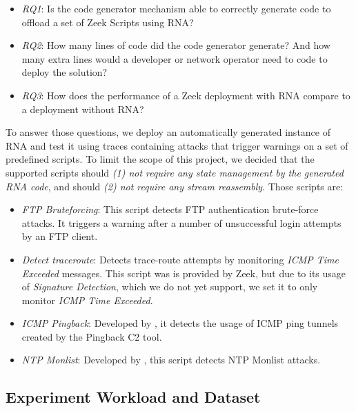 \begin{itemize}
    \item \textit{RQ1}: Is the code generator mechanism able to correctly generate code to offload a set of Zeek Scripts using RNA?
    
    \item \textit{RQ2}: How many lines of code did the code generator generate? And how many extra lines would a developer or network operator need to code to deploy the solution?
    
    \item \textit{RQ3}: How does the performance of a Zeek deployment with RNA compare to a deployment without RNA?
\end{itemize}

To answer those questions, we deploy an automatically generated instance of RNA and test it using traces containing attacks that trigger warnings on a set of predefined scripts. To limit the scope of this project, we decided that the supported scripts should \textit{(1) not require any state management by the generated RNA code}, and should \textit{(2) not require any stream reassembly}. Those scripts are:

\begin{itemize}
    \item \textit{FTP Bruteforcing}: This script detects FTP authentication brute-force attacks. It triggers a warning after a number of unsuccessful login attempts by an FTP client.
    \item \textit{Detect traceroute}: Detects trace-route attempts by monitoring \textit{ICMP Time Exceeded} messages. This script was is provided by Zeek, but due to its usage of \textit{Signature Detection}, which we do not yet support, we set it to only monitor \textit{ICMP Time Exceeded}.
    \item \textit{ICMP Pingback}: Developed by , it detects the usage of ICMP ping tunnels created by the Pingback C2 tool.
    \item \textit{NTP Monlist}: Developed by , this script detects NTP Monlist attacks.
\end{itemize}


\subsection{Experiment Workload and Dataset} %


